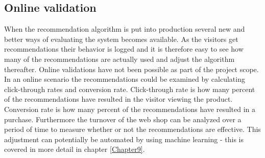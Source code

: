 \subsection{Online validation}
When the recommendation algorithm is put into production several new and better ways of evaluating the system becomes available. As the visitors get recommendations their behavior is logged and it is therefore easy to see how many of the recommendations are actually used and adjust the algorithm thereafter. Online validations have not been possible as part of the project scope. In an online scenario the recommendations could be examined by calculating click-through rates and conversion rate. Click-through rate is how many percent of the recommendations have resulted in the visitor viewing the product. Conversion rate is how many percent of the recommendations have resulted in a purchase. Furthermore the turnover of the web shop can be analyzed over a period of time to measure whether or not the recommendations are effective.
This adjustment can potentially be automated by using machine learning - this is covered in more detail in chapter \ref{Chapter9}.

 